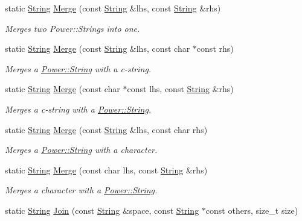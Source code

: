 \begin{DoxyCompactItemize}
static \hyperlink{class_power_1_1_string}{String} \hyperlink{class_power_1_1_string_a2ff1e27342ceff292fe081024a33f0d9}{Merge} (const \hyperlink{class_power_1_1_string}{String} \&lhs, const \hyperlink{class_power_1_1_string}{String} \&rhs)
\begin{DoxyCompactList}\small\item\em Merges two Power\+::\+Strings into one. \end{DoxyCompactList}\item 
static \hyperlink{class_power_1_1_string}{String} \hyperlink{class_power_1_1_string_a9514012041c69214d8e978f85721f669}{Merge} (const \hyperlink{class_power_1_1_string}{String} \&lhs, const char $\ast$const rhs)
\begin{DoxyCompactList}\small\item\em Merges a \hyperlink{class_power_1_1_string}{Power\+::\+String} with a c-\/string. \end{DoxyCompactList}\item 
static \hyperlink{class_power_1_1_string}{String} \hyperlink{class_power_1_1_string_a734b0571fa7f0e87323c1b467ec36da8}{Merge} (const char $\ast$const lhs, const \hyperlink{class_power_1_1_string}{String} \&rhs)
\begin{DoxyCompactList}\small\item\em Merges a c-\/string with a \hyperlink{class_power_1_1_string}{Power\+::\+String}. \end{DoxyCompactList}\item 
static \hyperlink{class_power_1_1_string}{String} \hyperlink{class_power_1_1_string_afbd0ab7834831ad0a7806ad1c5941307}{Merge} (const \hyperlink{class_power_1_1_string}{String} \&lhs, const char rhs)
\begin{DoxyCompactList}\small\item\em Merges a \hyperlink{class_power_1_1_string}{Power\+::\+String} with a character. \end{DoxyCompactList}\item 
static \hyperlink{class_power_1_1_string}{String} \hyperlink{class_power_1_1_string_a1d5cdefd626a60b3185f11a20e883f5c}{Merge} (const char lhs, const \hyperlink{class_power_1_1_string}{String} \&rhs)
\begin{DoxyCompactList}\small\item\em Merges a character with a \hyperlink{class_power_1_1_string}{Power\+::\+String}. \end{DoxyCompactList}\item 
static \hyperlink{class_power_1_1_string}{String} \hyperlink{class_power_1_1_string_ac4197801cb69b5bc00714f1a5bb638a6}{Join} (const \hyperlink{class_power_1_1_string}{String} \&space, const \hyperlink{class_power_1_1_string}{String} $\ast$const others, size\+\_\+t size)

\end{DoxyCompactItemize}
